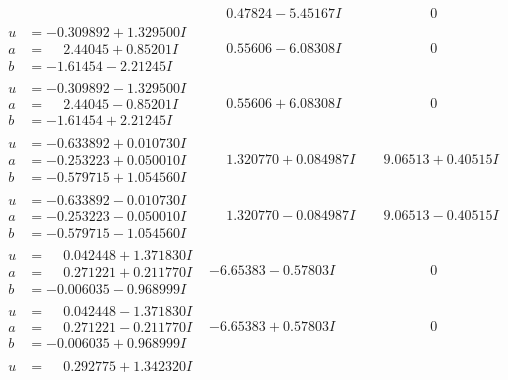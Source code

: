 \documentclass[1p]{elsarticle_modified}
\theoremstyle{definition}
\begin{document}
$$\begin{array}{c|c|c}
 & \phantom{-}0.47824 - 5.45167 I & \phantom{-0.000000 } 0 \\ \hline\begin{aligned}
u &= -0.309892 + 1.329500 I \\
a &= \phantom{-}2.44045 + 0.85201 I \\
b &= -1.61454 - 2.21245 I\end{aligned}
 & \phantom{-}0.55606 - 6.08308 I & \phantom{-0.000000 } 0 \\ \hline\begin{aligned}
u &= -0.309892 - 1.329500 I \\
a &= \phantom{-}2.44045 - 0.85201 I \\
b &= -1.61454 + 2.21245 I\end{aligned}
 & \phantom{-}0.55606 + 6.08308 I & \phantom{-0.000000 } 0 \\ \hline\begin{aligned}
u &= -0.633892 + 0.010730 I \\
a &= -0.253223 + 0.050010 I \\
b &= -0.579715 + 1.054560 I\end{aligned}
 & \phantom{-}1.320770 + 0.084987 I & \phantom{-}9.06513 + 0.40515 I \\ \hline\begin{aligned}
u &= -0.633892 - 0.010730 I \\
a &= -0.253223 - 0.050010 I \\
b &= -0.579715 - 1.054560 I\end{aligned}
 & \phantom{-}1.320770 - 0.084987 I & \phantom{-}9.06513 - 0.40515 I \\ \hline\begin{aligned}
u &= \phantom{-}0.042448 + 1.371830 I \\
a &= \phantom{-}0.271221 + 0.211770 I \\
b &= -0.006035 - 0.968999 I\end{aligned}
 & -6.65383 - 0.57803 I & \phantom{-0.000000 } 0 \\ \hline\begin{aligned}
u &= \phantom{-}0.042448 - 1.371830 I \\
a &= \phantom{-}0.271221 - 0.211770 I \\
b &= -0.006035 + 0.968999 I\end{aligned}
 & -6.65383 + 0.57803 I & \phantom{-0.000000 } 0 \\ \hline\begin{aligned}
u &= \phantom{-}0.292775 + 1.342320 I \\

\end{aligned}
\end{array}$$
\end{document}
